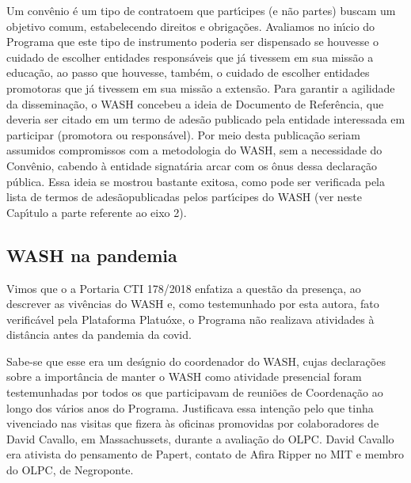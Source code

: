 \documentclass[
12pt,		%
openright,	%
twoside,  %
a4paper,			%
chapter=TITLE,		%
english,			%
french,				%
spanish,			%
brazil				%
]{USPSC-classe/USPSC}
\begin{document}
Um conv\^enio \'e um tipo de \textquotedbl contrato\textquotedbl  em que part\'{\i}cipes (e n\~ao partes) buscam um objetivo comum, estabelecendo direitos e obriga\c{c}\~oes. Avaliamos no in\'{\i}cio do Programa que este tipo de instrumento poderia ser dispensado se houvesse o cuidado de escolher entidades respons\'aveis que j\'a tivessem em sua miss\~ao a educa\c{c}\~ao, ao passo que houvesse, tamb\'em, o cuidado de escolher entidades promotoras que j\'a tivessem em sua miss\~ao a extens\~ao. Para garantir a agilidade da dissemina\c{c}\~ao, o WASH concebeu a ideia de \textquotedbl Documento de Refer\^encia\textquotedbl , que deveria ser citado em um termo de ades\~ao publicado pela entidade interessada em participar (promotora ou respons\'avel). Por meio desta publica\c{c}\~ao seriam assumidos compromissos com a metodologia do WASH, sem a necessidade do Conv\^enio, cabendo \`a entidade signat\'aria arcar com os \^onus dessa declara\c{c}\~ao p\'ublica. Essa ideia se mostrou bastante exitosa, como pode ser verificada pela lista de \textquotedbl termos de ades\~ao\textquotedbl  publicadas pelos part\'{\i}cipes do WASH (ver neste Cap\'{\i}tulo a parte referente ao eixo 2).









\subsection[WASH na pandemia]{WASH na pandemia}\label{WASH na pandemia}
Vimos que o a Portaria CTI 178/2018 enfatiza a quest\~ao da \textquotedbl presen\c{c}a\textquotedbl , ao descrever as viv\^encias do WASH e, como testemunhado por esta autora, fato verific\'avel pela Plataforma Platu\'oxe, o Programa n\~ao realizava atividades \`a dist\^ancia antes da pandemia da covid.









Sabe-se que esse era um des\'{\i}gnio do coordenador do WASH, cujas declara\c{c}\~oes sobre a import\^ancia de manter o WASH como atividade presencial foram testemunhadas por todos os que participavam de reuni\~oes de Coordena\c{c}\~ao ao longo dos v\'arios anos do Programa. Justificava essa inten\c{c}\~ao pelo que tinha vivenciado nas visitas que fizera \`as oficinas promovidas por colaboradores de David Cavallo, em Massachussets, durante a avalia\c{c}\~ao do OLPC. David Cavallo era ativista do pensamento de Papert, contato de Afira Ripper no MIT e membro do OLPC, de Negroponte.
\end{document}
